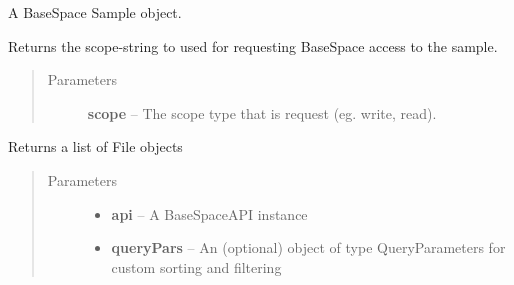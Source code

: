 \documentclass[letterpaper,10pt,english]{sphinxmanual}
\begin{document}
\begin{fulllineitems}
\label{Available modules:BaseSpacePy.model.Sample.Sample}
A BaseSpace Sample object.

\begin{fulllineitems}
\label{Available modules:BaseSpacePy.model.Sample.Sample.getAccessStr}
Returns the scope-string to used for requesting BaseSpace access to the sample.
\begin{quote}\begin{description}
\item[{Parameters}] \leavevmode
\textbf{scope} -- The scope type that is request (eg. write, read).

\end{description}\end{quote}

\end{fulllineitems}


\begin{fulllineitems}
\label{Available modules:BaseSpacePy.model.Sample.Sample.getFiles}
Returns a list of File objects
\begin{quote}\begin{description}
\item[{Parameters}] \leavevmode\begin{itemize}
\item {} 
\textbf{api} -- A BaseSpaceAPI instance

\item {} 
\textbf{queryPars} -- An (optional) object of type QueryParameters for custom sorting and filtering

\end{itemize}

\end{description}\end{quote}

\end{fulllineitems}



\end{fulllineitems}
\end{document}
